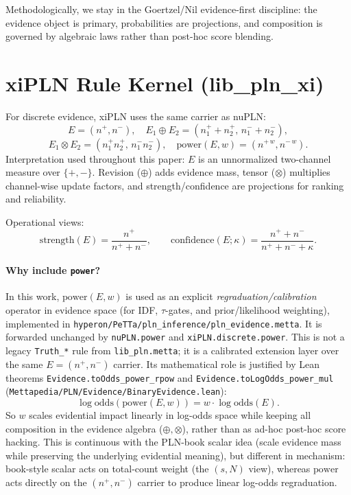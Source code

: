 \documentclass[11pt]{article}
\newcommand{\lpath}[1]{\texttt{\nolinkurl{#1}}}
\newcommand{\lid}[1]{{\ttfamily\nolinkurl{#1}}}
\begin{document}
\noindent
Methodologically, we stay in the Goertzel/Nil evidence-first discipline:
the evidence object is primary, probabilities are projections, and composition is
governed by algebraic laws rather than post-hoc score blending.

\section{xiPLN Rule Kernel (lib\_pln\_xi)}
For discrete evidence, xiPLN uses the same carrier as nuPLN:
\[
E=(n^+,n^-),\quad E_1\oplus E_2=(n_1^+ + n_2^+,\, n_1^- + n_2^-),
\]
\[
E_1\otimes E_2=(n_1^+ n_2^+,\, n_1^- n_2^-),\quad
\mathrm{power}(E,w)=(n^{+\,w},n^{-\,w}).
\]
Interpretation used throughout this paper: \(E\) is an unnormalized two-channel
measure over \(\{+,-\}\). Revision (\(\oplus\)) adds evidence mass, tensor
(\(\otimes\)) multiplies channel-wise update factors, and strength/confidence are
projections for ranking and reliability.

Operational views:
\[
\mathrm{strength}(E)=\frac{n^+}{n^+ + n^-},\qquad
\mathrm{confidence}(E;\kappa)=\frac{n^+ + n^-}{n^+ + n^- + \kappa}.
\]
\paragraph{Why include \texorpdfstring{\lid{power}}{power}?}
In this work, \(\mathrm{power}(E,w)\) is used as an explicit
\emph{regraduation/calibration} operator in evidence space
(for IDF, \(\tau\)-gates, and prior/likelihood weighting),
implemented in \lpath{hyperon/PeTTa/pln_inference/pln_evidence.metta}.
It is forwarded unchanged by \lid{nuPLN.power} and
\lid{xiPLN.discrete.power}. This is not a legacy
\lid{Truth_*} rule from \lpath{lib_pln.metta}; it is a calibrated extension
layer over the same \(E=(n^+,n^-)\) carrier.
Its mathematical role is justified by Lean theorems
\lid{Evidence.toOdds_power_rpow} and \lid{Evidence.toLogOdds_power_mul}
(\lpath{Mettapedia/PLN/Evidence/BinaryEvidence.lean}):
\[
\log\mathrm{odds}(\mathrm{power}(E,w)) = w\cdot \log\mathrm{odds}(E).
\]
So \(w\) scales evidential impact linearly in log-odds space while keeping all
composition in the evidence algebra (\(\oplus,\otimes\)), rather than as ad-hoc
post-hoc score hacking.
This is continuous with the PLN-book scalar idea (scale evidence mass while
preserving the underlying evidential meaning), but different in mechanism:
book-style scalar acts on total-count weight (the \((s,N)\) view), whereas
\(\mathrm{power}\) acts directly on the \((n^+,n^-)\) carrier to produce linear
log-odds regraduation.
\end{document}
